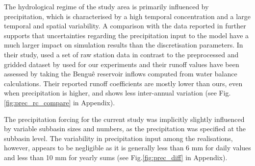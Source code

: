 The hydrological regime of the study area is primarily influenced by precipitation, which is characterised by a high temporal concentration and a large temporal and spatial variability.
A comparison with the data reported in \citet{Medeiros2014b} further supports that uncertainties regarding the precipitation input to the model have a much larger impact on simulation results than the discretisation parameters.
In their study, \citet{Medeiros2014b} used a set of raw station data in contrast to the preprocessed and gridded dataset by \citet{Xavier2016} used for our experiments and their runoff values have been assessed by taking the Bengu\^e reservoir inflows computed from water balance calculations.
Their reported runoff coefficients are mostly lower than ours, even when precipitation is higher, and shows less inter-annual variation (see Fig.\DIFaddbegin \DIFadd{\ }\DIFaddend \ref{fig:prec_rc_compare} in Appendix).

The precipitation forcing for the current study was implicitly slightly influenced by variable subbasin sizes and numbers, as the precipitation was specified at the subbasin level.
The variability in precipitation input among the realisations, however, appears to be negligible as it is generally less than 6 \unit{mm} for daily values and less than 10 \unit{mm} for yearly sums (see Fig.\DIFaddbegin \DIFadd{\ }\DIFaddend \ref{fig:prec_diff} in Appendix).

\DIFdelbegin {}\DIFdelend \DIFaddbegin {}

